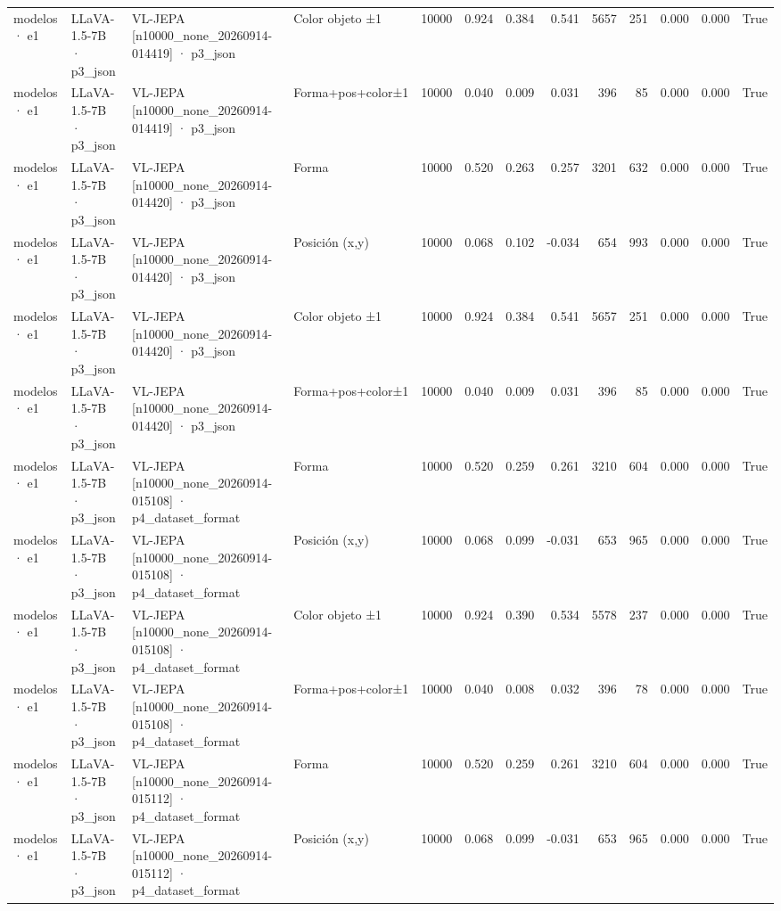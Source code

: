 \begin{tabular}{llllrrrrrrrrr}
modelos · e1 & LLaVA-1.5-7B · p3\_json & VL-JEPA [n10000\_none\_20260914-014419] · p3\_json & Color objeto ±1 & 10000 & 0.924 & 0.384 & 0.541 & 5657 & 251 & 0.000 & 0.000 & True \\
modelos · e1 & LLaVA-1.5-7B · p3\_json & VL-JEPA [n10000\_none\_20260914-014419] · p3\_json & Forma+pos+color±1 & 10000 & 0.040 & 0.009 & 0.031 & 396 & 85 & 0.000 & 0.000 & True \\
modelos · e1 & LLaVA-1.5-7B · p3\_json & VL-JEPA [n10000\_none\_20260914-014420] · p3\_json & Forma & 10000 & 0.520 & 0.263 & 0.257 & 3201 & 632 & 0.000 & 0.000 & True \\
modelos · e1 & LLaVA-1.5-7B · p3\_json & VL-JEPA [n10000\_none\_20260914-014420] · p3\_json & Posición (x,y) & 10000 & 0.068 & 0.102 & -0.034 & 654 & 993 & 0.000 & 0.000 & True \\
modelos · e1 & LLaVA-1.5-7B · p3\_json & VL-JEPA [n10000\_none\_20260914-014420] · p3\_json & Color objeto ±1 & 10000 & 0.924 & 0.384 & 0.541 & 5657 & 251 & 0.000 & 0.000 & True \\
modelos · e1 & LLaVA-1.5-7B · p3\_json & VL-JEPA [n10000\_none\_20260914-014420] · p3\_json & Forma+pos+color±1 & 10000 & 0.040 & 0.009 & 0.031 & 396 & 85 & 0.000 & 0.000 & True \\
modelos · e1 & LLaVA-1.5-7B · p3\_json & VL-JEPA [n10000\_none\_20260914-015108] · p4\_dataset\_format & Forma & 10000 & 0.520 & 0.259 & 0.261 & 3210 & 604 & 0.000 & 0.000 & True \\
modelos · e1 & LLaVA-1.5-7B · p3\_json & VL-JEPA [n10000\_none\_20260914-015108] · p4\_dataset\_format & Posición (x,y) & 10000 & 0.068 & 0.099 & -0.031 & 653 & 965 & 0.000 & 0.000 & True \\
modelos · e1 & LLaVA-1.5-7B · p3\_json & VL-JEPA [n10000\_none\_20260914-015108] · p4\_dataset\_format & Color objeto ±1 & 10000 & 0.924 & 0.390 & 0.534 & 5578 & 237 & 0.000 & 0.000 & True \\
modelos · e1 & LLaVA-1.5-7B · p3\_json & VL-JEPA [n10000\_none\_20260914-015108] · p4\_dataset\_format & Forma+pos+color±1 & 10000 & 0.040 & 0.008 & 0.032 & 396 & 78 & 0.000 & 0.000 & True \\
modelos · e1 & LLaVA-1.5-7B · p3\_json & VL-JEPA [n10000\_none\_20260914-015112] · p4\_dataset\_format & Forma & 10000 & 0.520 & 0.259 & 0.261 & 3210 & 604 & 0.000 & 0.000 & True \\
modelos · e1 & LLaVA-1.5-7B · p3\_json & VL-JEPA [n10000\_none\_20260914-015112] · p4\_dataset\_format & Posición (x,y) & 10000 & 0.068 & 0.099 & -0.031 & 653 & 965 & 0.000 & 0.000 & True \\

\end{tabular}
